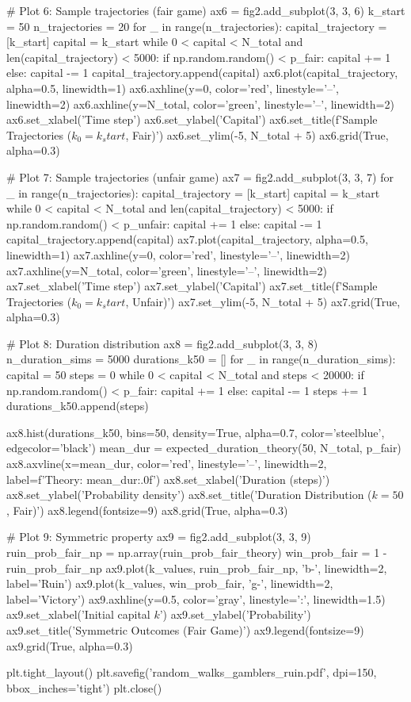 \documentclass[a4paper, 11pt]{article}
\begin{document}
\begin{pycode}
# Plot 6: Sample trajectories (fair game)
ax6 = fig2.add_subplot(3, 3, 6)
k_start = 50
n_trajectories = 20
for _ in range(n_trajectories):
    capital_trajectory = [k_start]
    capital = k_start
    while 0 < capital < N_total and len(capital_trajectory) < 5000:
        if np.random.random() < p_fair:
            capital += 1
        else:
            capital -= 1
        capital_trajectory.append(capital)
    ax6.plot(capital_trajectory, alpha=0.5, linewidth=1)
ax6.axhline(y=0, color='red', linestyle='--', linewidth=2)
ax6.axhline(y=N_total, color='green', linestyle='--', linewidth=2)
ax6.set_xlabel('Time step')
ax6.set_ylabel('Capital')
ax6.set_title(f'Sample Trajectories ($k_0={k_start}$, Fair)')
ax6.set_ylim(-5, N_total + 5)
ax6.grid(True, alpha=0.3)

# Plot 7: Sample trajectories (unfair game)
ax7 = fig2.add_subplot(3, 3, 7)
for _ in range(n_trajectories):
    capital_trajectory = [k_start]
    capital = k_start
    while 0 < capital < N_total and len(capital_trajectory) < 5000:
        if np.random.random() < p_unfair:
            capital += 1
        else:
            capital -= 1
        capital_trajectory.append(capital)
    ax7.plot(capital_trajectory, alpha=0.5, linewidth=1)
ax7.axhline(y=0, color='red', linestyle='--', linewidth=2)
ax7.axhline(y=N_total, color='green', linestyle='--', linewidth=2)
ax7.set_xlabel('Time step')
ax7.set_ylabel('Capital')
ax7.set_title(f'Sample Trajectories ($k_0={k_start}$, Unfair)')
ax7.set_ylim(-5, N_total + 5)
ax7.grid(True, alpha=0.3)

# Plot 8: Duration distribution
ax8 = fig2.add_subplot(3, 3, 8)
n_duration_sims = 5000
durations_k50 = []
for _ in range(n_duration_sims):
    capital = 50
    steps = 0
    while 0 < capital < N_total and steps < 20000:
        if np.random.random() < p_fair:
            capital += 1
        else:
            capital -= 1
        steps += 1
    durations_k50.append(steps)

ax8.hist(durations_k50, bins=50, density=True, alpha=0.7, color='steelblue',
         edgecolor='black')
mean_dur = expected_duration_theory(50, N_total, p_fair)
ax8.axvline(x=mean_dur, color='red', linestyle='--', linewidth=2,
            label=f'Theory: {mean_dur:.0f}')
ax8.set_xlabel('Duration (steps)')
ax8.set_ylabel('Probability density')
ax8.set_title('Duration Distribution ($k=50$, Fair)')
ax8.legend(fontsize=9)
ax8.grid(True, alpha=0.3)

# Plot 9: Symmetric property
ax9 = fig2.add_subplot(3, 3, 9)
ruin_prob_fair_np = np.array(ruin_prob_fair_theory)
win_prob_fair = 1 - ruin_prob_fair_np
ax9.plot(k_values, ruin_prob_fair_np, 'b-', linewidth=2, label='Ruin')
ax9.plot(k_values, win_prob_fair, 'g-', linewidth=2, label='Victory')
ax9.axhline(y=0.5, color='gray', linestyle=':', linewidth=1.5)
ax9.set_xlabel('Initial capital $k$')
ax9.set_ylabel('Probability')
ax9.set_title('Symmetric Outcomes (Fair Game)')
ax9.legend(fontsize=9)
ax9.grid(True, alpha=0.3)

plt.tight_layout()
plt.savefig('random_walks_gamblers_ruin.pdf', dpi=150, bbox_inches='tight')
plt.close()
\end{pycode}
\end{document}
